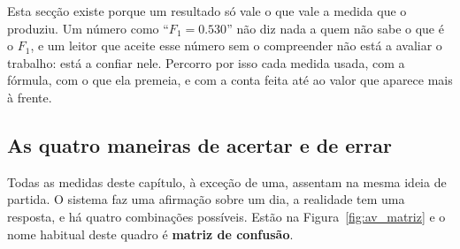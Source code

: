 Esta secção existe porque um resultado só vale o que vale a medida que o produziu. Um número como
``$F_1 = 0.530$'' não diz nada a quem não sabe o que é o $F_1$, e um leitor que aceite esse número
sem o compreender não está a avaliar o trabalho: está a confiar nele. Percorro por isso cada medida
usada, com a fórmula, com o que ela premeia, e com a conta feita até ao valor que aparece mais à
frente.

\subsection{As quatro maneiras de acertar e de errar}
\label{sec:av_matriz}

Todas as medidas deste capítulo, à exceção de uma, assentam na mesma ideia de partida. O sistema faz
uma afirmação sobre um dia, a realidade tem uma resposta, e há quatro combinações possíveis. Estão na
Figura~\ref{fig:av_matriz} e o nome habitual deste quadro é \textbf{matriz de confusão}.

